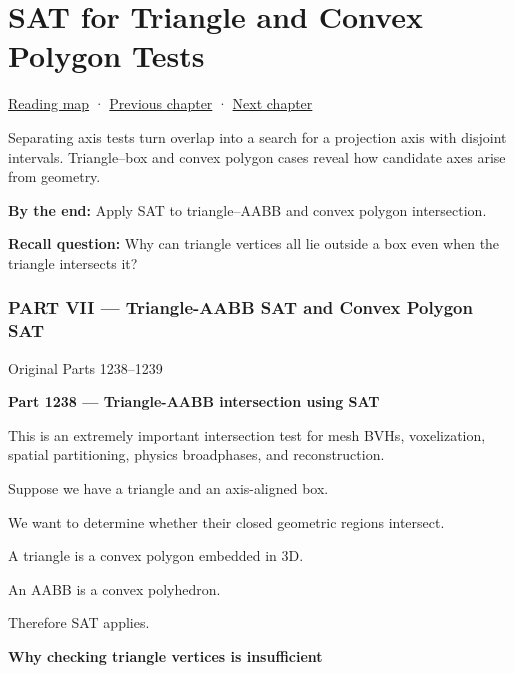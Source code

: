 \chapter{SAT for Triangle and Convex Polygon Tests}\label{04-visual-computing-ii-ch025-sat-for-triangle-and-convex-polygon-tests}\hypertarget{04-visual-computing-ii-ch025}{}\label{stagechapter:04-visual-computing-ii-ch025}

\hypertarget{04-visual-computing-ii-ch025-sat-for-triangle-and-convex-polygon-tests}{}

\hyperref[volume-reading-map]{Reading map} · \hyperref[04-visual-computing-ii-ch024-raytriangle-intersection]{Previous chapter} · \hyperref[04-visual-computing-ii-ch026-contact-features-and-manifolds]{Next chapter}

Separating axis tests turn overlap into a search for a projection axis with disjoint intervals. Triangle--box and convex polygon cases reveal how candidate axes arise from geometry.

\textbf{By the end:} Apply SAT to triangle--AABB and convex polygon intersection.

\textbf{Recall question:} Why can triangle vertices all lie outside a box even when the triangle intersects it?

\subsection{PART VII --- Triangle-AABB SAT and Convex Polygon SAT}\label{04-visual-computing-ii-ch025-part-vii-triangle-aabb-sat-and-convex-polygon-sat}

\hypertarget{04-visual-computing-ii-ch025-part-vii-triangle-aabb-sat-and-convex-polygon-sat}{}

Original Parts 1238--1239

\textbf{Part 1238 --- Triangle-AABB intersection using SAT}

This is an extremely important intersection test for mesh BVHs, voxelization, spatial partitioning, physics broadphases, and reconstruction.

Suppose we have a triangle and an axis-aligned box.

We want to determine whether their closed geometric regions intersect.

A triangle is a convex polygon embedded in 3D.

An AABB is a convex polyhedron.

Therefore SAT applies.

\textbf{Why checking triangle vertices is insufficient}


